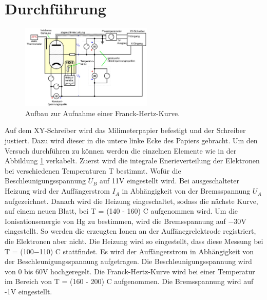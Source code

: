 \section{Durchführung}
\label{sec:Durchführung}

\begin{figure}
    \centering
    \includegraphics[height=4.0cm]{data/abb3.jpg}
    \caption{Aufbau zur Aufnahme einer Franck-Hertz-Kurve. \cite{V601}}
    \label{fig:abb3}
\end{figure}
Auf dem XY-Schreiber wird das Milimeterpapier befestigt und der Schreiber justiert.
Dazu wird dieser in die untere linke Ecke des Papiers gebracht.
Um den Versuch durchführen zu können werden die einzelnen Elemente wie in der Abbildung \ref{fig:abb3} verkabelt.
Zuerst wird die integrale Enerieverteilung der Elektronen bei verschiedenen Temperaturen T bestimmt.
Wofür die Beschleunigungsspannung $U_B$ auf 11V eingestellt wird.
Bei ausgeschalteter Heizung wird der Auffängerstrom $I_A$ in Abhängigkeit von der Bremsspannung $U_A$ aufgezeichnet.
Danach wird die Heizung eingeschaltet, sodass die nächste Kurve, auf einem neuen Blatt, bei T = (140 - 160) \circ C aufgenommen wird.
Um die Ionisationsenergie von Hg zu bestimmen, wird die Bremsspannung auf −30V eingestellt.
So werden die erzeugten Ionen an der Auffänegrelektrode registriert, die Elektronen aber nicht.
Die Heizung wird so eingestellt, dass diese Messung bei T = (100−110) \circ C stattfindet.
Es wird der Auffängerstrom in Abhängigkeit von der Beschleunigungsspannung aufgetragen.
Die Beschleunigungsspannung wird von 0 bis 60V hochgeregelt.
Die Franck-Hertz-Kurve wird bei einer Temperatur im Bereich von  T = (160 - 200) \circ C aufgenommen.
Die Bremsspannung wird auf -1V eingestellt.